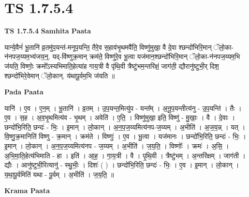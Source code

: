 \documentclass[17pt]{extarticle}
\begin{document}
\section{ TS 1.7.5.4 }

\textbf{TS 1.7.5.4 } \newline
\textbf{Samhita Paata} \newline

यान्ये॒वैनं॑ भू॒तानि॑ व्र॒तमु॑प॒यन्त॑-मनूप॒यन्ति॒ तैरे॒व स॒हाव॑भृ॒थमवै॑ति॒ विष्णु॑मुखा॒ वै दे॒वा श्छन्दो॑भिरि॒मान् ॅलो॒का-न॑नपज॒य्यम॒भ्य॑जय॒न्॒. यद्-वि॑ष्णुक्र॒मान् क्रम॑ते॒ विष्णु॑रे॒व भू॒त्वा यज॑मान॒श्छन्दो॑भिरि॒मान् ॅलो॒का-न॑नपज॒य्यम॒भि ज॑यति॒ विष्णोः॒ क्रमो᳚ऽस्यभिमाति॒हेत्या॑ह गाय॒त्री वै पृ॑थि॒वी त्रैष्टु॑भम॒न्तरि॑क्षं॒ जाग॑ती॒ द्यौरानु॑ष्टुभी॒र् दिश॒ श्छन्दो॑भिरे॒वेमान् ॅलो॒कान्. य॑थापू॒र्वम॒भि ज॑यति ॥ \newline

\textbf{Pada Paata} \newline

यानि॑ । ए॒व । ए॒न॒म् । भू॒तानि॑ । व्र॒तम् । उ॒प॒यन्त॒मित्यु॑प - यन्त᳚म् । अ॒नू॒प॒यन्तीत्य॑नु - उ॒प॒यन्ति॑ । तैः । ए॒व । स॒ह । अ॒व॒भृ॒थमित्य॑व - भृ॒थम् । अवेति॑ । ए॒ति॒ । विष्णु॑मुखा॒ इति॒ विष्णु॑ - मु॒खाः॒ । वै । दे॒वाः । छन्दो॑भि॒रिति॒ छन्दः॑ - भिः॒ । इ॒मान् । लो॒कान् । अ॒न॒प॒ज॒य्यमित्य॑नप-ज॒य्यम् । अ॒भीति॑ । अ॒ज॒य॒न्न् । यत् । वि॒ष्णु॒क्र॒मानिति॑ विष्णु - क्र॒मान् । क्रम॑ते । विष्णुः॑ । ए॒व । भू॒त्वा । यज॑मानः । छन्दो॑भि॒रिति॒ छन्दः॑ - भिः॒ । इ॒मान् । लो॒कान् । अ॒न॒प॒ज॒य्यमित्य॑नप - ज॒य्यम् । अ॒भीति॑ । ज॒य॒ति॒ । विष्णोः᳚ । क्रमः॑ । अ॒सि॒ । अ॒भि॒मा॒ति॒हेत्य॑भिमाति - हा । इति॑ । आ॒ह॒ । गा॒य॒त्री । वै । पृ॒थि॒वी । त्रैष्टु॑भम् । अ॒न्तरि॑क्षम् । जाग॑ती । द्यौः । आनु॑ष्टुभी॒रित्यानु॑ - स्थु॒भीः॒ । दिशः॑ ( ) । छन्दो॑भि॒रिति॒ छन्दः॑ - भिः॒ । ए॒व । इ॒मान् । लो॒कान् । य॒था॒पू॒र्वमिति॑ यथा - पू॒र्वम् । अ॒भीति॑ । ज॒य॒ति॒ ॥  \newline


\textbf{Krama Paata} \newline
\end{document}
